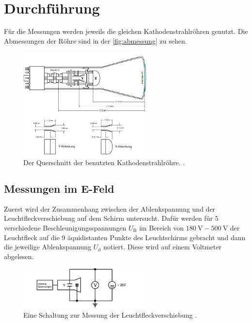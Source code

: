\section{Durchführung}
\label{sec:Durchführung}

Für die Messungen werden jeweils die gleichen Kathodenstrahlröhren genutzt. Die Abmessungen der Röhre sind in der \autoref{fig:abmessung} zu sehen.

\begin{figure}[H]
    \centering
    \includegraphics[width=0.6\textwidth]{bilder/abmessung_roehre.png}
    \caption{Der Querschnitt der benutzten Kathodenstrahlröhre. \cite{anleitung501}.}
    \label{fig:abmessung}
\end{figure}

\subsection{Messungen im E-Feld}

    Zuerst wird der Zusammenhang zwischen der Ablenkspannung und der Leuchtfleckverschiebung auf dem Schirm untersucht. Dafür werden für 5 verschiedene 
    Beschleunigungsspannungen $U_{\text{B}}$ im Bereich von $\SI{180}{\volt} - \SI{500}{\volt}$ der Leuchtfleck auf die 9 äquidistanten Punkte des 
    Leuchtschirms gebracht und dann die jeweilige Ablenkspannung $U_{\text{d}}$ notiert. Diese wird auf einem Voltmeter abgelesen.

    \begin{figure}[H]
        \centering
        \includegraphics[width=0.6\textwidth]{bilder/messung_leuchtfleckverschiebung.jpg}
        \caption{Eine Schaltung zur Messung der Leuchtfleckverschiebung \cite{anleitung501}.}
        \label{fig:leuchtfleckverschiebung}
    \end{figure}

